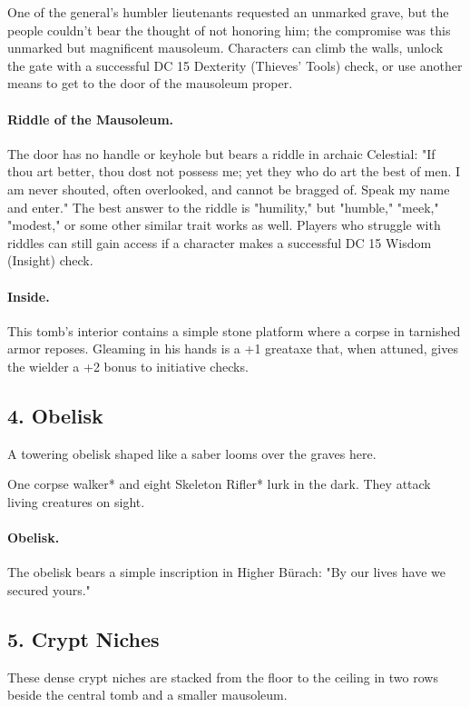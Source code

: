 \documentclass[10pt,a4paper,twoside,twocolumn,openany,bg=print,nodeprecatedcode]{dndbook}
\begin{document}
One of the general's humbler lieutenants requested an unmarked grave, but the people couldn't bear the thought of not honoring him; the compromise was this unmarked but magnificent mausoleum. Characters can climb the walls, unlock the gate with a successful DC 15 Dexterity (Thieves' Tools) check, or use another means to get to the door of the mausoleum proper.
\paragraph{Riddle of the Mausoleum.}
The door has no handle or keyhole but bears a riddle in archaic Celestial: "If thou art better, thou dost not possess me; yet they who do art the best of men. I am never shouted, often overlooked, and cannot be bragged of. Speak my name and enter." The best answer to the riddle is "humility," but "humble," "meek," "modest," or some other similar trait works as well. Players who struggle with riddles can still gain access if a character makes a successful DC 15 Wisdom (Insight) check.
\paragraph{Inside.}
This tomb's interior contains a simple stone platform where a corpse in tarnished armor reposes. Gleaming in his hands is a +1 greataxe that, when attuned, gives the wielder a +2 bonus to initiative checks.
\subsection{4. Obelisk}
\begin{DndReadAloud}{}
A towering obelisk shaped like a saber looms over the graves here.
\end{DndReadAloud}

One corpse walker* and eight Skeleton Rifler* lurk in the dark. They attack living creatures on sight.
\paragraph{Obelisk.}
The obelisk bears a simple inscription in Higher Bürach: "By our lives have we secured yours."
\subsection{5. Crypt Niches}
\begin{DndReadAloud}{}
These dense crypt niches are stacked from the floor to the ceiling in two rows beside the central tomb and a smaller mausoleum.
\end{DndReadAloud}
\end{document}
